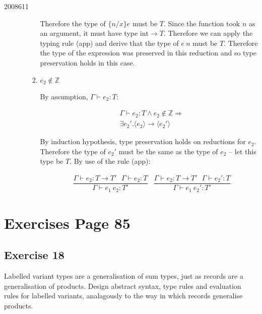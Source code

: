 \documentclass[10pt,\jkfside,a4paper]{article}
\begin{document}
\begin{examquestion}{2008}{6}{11}
\begin{enumerate}[label=(\alph*)]
\begin{enumerate}[label=\textbf{Case}]
\begin{enumerate}[label=\textbf{case}]
Therefore the type of $\{n/x\}e$ must be $T$. Since the function took $n$ as
an argument, it must have type $\text{int} \to T$. Therefore we can apply
the typing rule (app) and derive that the type of $e \ n$ must be $T$.
Therefore the type of the expression was preserved in this reduction and so
type preservation holds in this case.

\item $e_2 \notin \mathbb{Z}$

By assumption, $\Gamma \vdash e_2 : T$:

\[
\begin{split}
&\Gamma \vdash e_2 : T \wedge e_2 \notin \mathbb{Z} \Longrightarrow \\
&\exists e_2'. \langle e_2 \rangle \to \langle e_2' \rangle
\end{split}
\]

By induction hypothesis, type preservation holds on reductions for $e_2$.
Therefore the type of $e_2'$ must be the same as the type of $e_2$ -- let
this type be $T$. By use of the rule (app):

\begin{align*}
&
\dfrac{
\Gamma \vdash e_2: T \to T' \ \ \ \Gamma \vdash e_2: T
}{
\Gamma \vdash e_1 \ e_2: T'
}
&
\dfrac{
\Gamma \vdash e_2: T \to T' \ \ \ \Gamma \vdash e_2': T
}{
\Gamma \vdash e_1 \ e_2': T'
}
\end{align*}

\end{enumerate}

\end{enumerate}

\end{enumerate}

\end{examquestion}

\section{Exercises Page 85}

\subsection*{Exercise 18}

Labelled variant types are a generalisation of sum types, just as
records are a generalisation of products. Design abstract syntax, type rules
and evaluation rules for labelled variants, analagously to the way in which
records generalise products.
\end{document}
